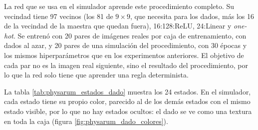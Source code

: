 La red que se usa en el simulador aprende este procedimiento completo. Su vecindad tiene 97 vecinos (los 81 de $9 \times 9$, que necesita para los dados, más los 16 de la vecindad de la maestra que quedan fuera), 16:128:ReLU, 24:Linear y \textit{one-hot}. Se entrenó con 20 pares de imágenes reales por caja de entrenamiento, con dados al azar, y 20 pares de una simulación del procedimiento, con 30 épocas y los mismos hiperparámetros que en los experimentos anteriores. El objetivo de cada par no es la imagen real siguiente, sino el resultado del procedimiento, por lo que la red solo tiene que aprender una regla determinista.

\newcommand{\estadodado}[2][black]{\fcolorbox{gray}{physarumd#2}{\makebox[1.3em]{\textcolor{#1}{#2}}}}

La tabla \ref{tab:physarum_estados_dado} muestra los 24 estados. En el simulador, cada estado tiene su propio color, parecido al de los demás estados con el mismo estado visible, por lo que no hay estados ocultos: el dado se ve como una textura en toda la caja (figura \ref{fig:physarum_dado_colores}).

